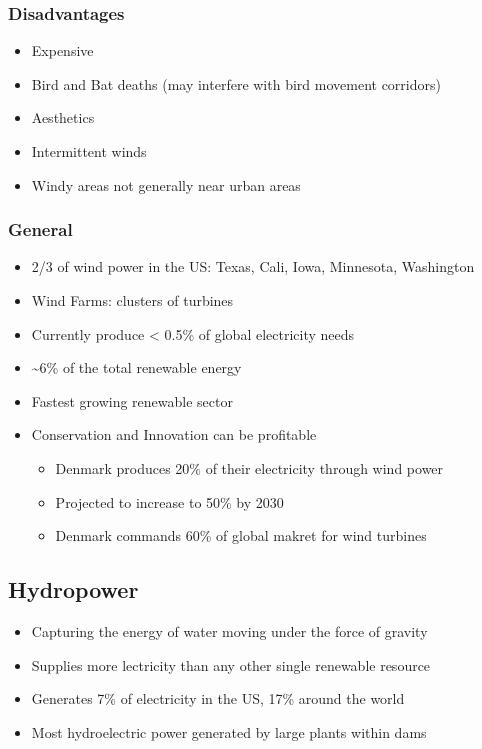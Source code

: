 \documentclass[11pt]{article}
\begin{document}
\subsubsection{Disadvantages}
\label{sec:org285ff96}
\begin{itemize}
\item Expensive
\item Bird and Bat deaths (may interfere with bird movement corridors)
\item Aesthetics
\item Intermittent winds
\item Windy areas not generally near urban areas
\end{itemize}
\subsubsection{General}
\label{sec:org7f77399}
\begin{itemize}
\item 2/3 of wind power in the US: Texas, Cali, Iowa, Minnesota, Washington
\item Wind Farms: clusters of turbines
\item Currently produce < 0.5\% of global electricity needs
\item \textasciitilde{}6\% of the total renewable energy
\item Fastest growing renewable sector
\item Conservation and Innovation can be profitable
\begin{itemize}
\item Denmark produces 20\% of their electricity through wind power
\item Projected to increase to 50\% by 2030
\item Denmark commands 60\% of global makret for wind turbines
\end{itemize}
\end{itemize}
\subsection{Hydropower}
\label{sec:org5a7ab0e}
\begin{itemize}
\item Capturing the energy of water moving under the force of gravity
\item Supplies more lectricity than any other single renewable resource
\item Generates 7\% of electricity in the US, 17\% around the world
\item Most hydroelectric power generated by large plants within dams
\end{itemize}
\end{document}
